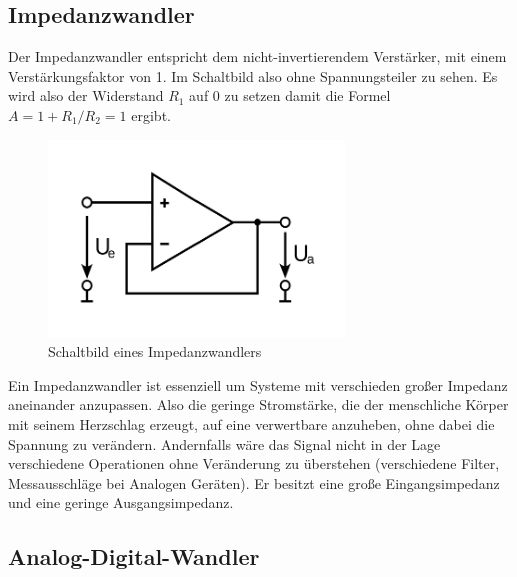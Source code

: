 \subsection{Impedanzwandler}

Der Impedanzwandler entspricht dem nicht-invertierendem Verstärker, mit einem Verstärkungsfaktor von 1. Im Schaltbild also ohne Spannungsteiler zu sehen. Es wird also der Widerstand $R_1$ auf 0 zu setzen damit die Formel $A= 1+ R_1/R_2 = 1$ ergibt.
\begin{figure}[H]
     \centering
     \includegraphics[width=0.7\textwidth]{Abb/impconv.pdf}
     \caption{Schaltbild eines Impedanzwandlers}
\end{figure}
Ein Impedanzwandler ist essenziell um Systeme mit verschieden großer Impedanz aneinander anzupassen. Also die geringe Stromstärke, die der menschliche Körper mit seinem Herzschlag erzeugt, auf eine verwertbare anzuheben, ohne dabei die Spannung zu verändern. Andernfalls wäre das Signal nicht in der Lage verschiedene Operationen ohne Veränderung zu überstehen (verschiedene Filter, Messausschläge bei Analogen Geräten). Er besitzt eine große Eingangsimpedanz und eine geringe Ausgangsimpedanz. 

\subsection{Analog-Digital-Wandler}

